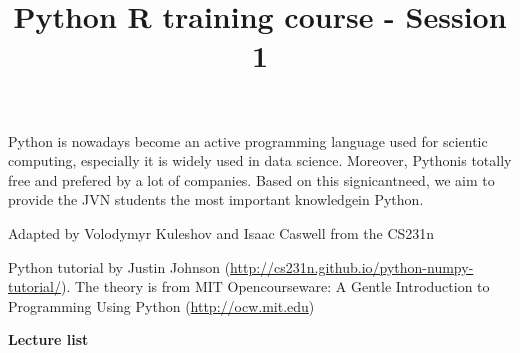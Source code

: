 \documentclass[11pt]{article}
\title{Python R training course - Session 1}
\begin{document}
    
    
    \maketitle
    
    

    
    Python is nowadays become an active programming language used for
scientic computing, especially it is widely used in data science.
Moreover, Pythonis totally free and prefered by a lot of companies.
Based on this signicantneed, we aim to provide the JVN students the most
important knowledgein Python.

Adapted by Volodymyr Kuleshov and Isaac Caswell from the CS231n

Python tutorial by Justin Johnson
(\url{http://cs231n.github.io/python-numpy-tutorial/}). The theory is
from MIT Opencourseware: A Gentle Introduction to Programming Using
Python
(\href{http://ocw.mit.edu/courses/electrical-engineering-and-computer-science/6-189-a-gentle-introduction-to-programming-using-python-january-iap-2011/readings/}{http://ocw.mit.edu})

\textbf{Lecture list}
\end{document}
